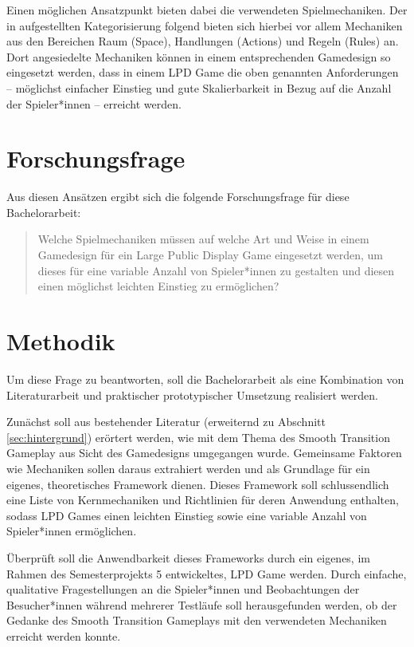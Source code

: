 Einen möglichen Ansatzpunkt bieten dabei die verwendeten Spielmechaniken. Der in \cite{Schell2014} aufgestellten Kategorisierung folgend bieten sich hierbei vor allem Mechaniken aus den Bereichen Raum (Space), Handlungen (Actions) und Regeln (Rules) an. Dort angesiedelte Mechaniken können in einem entsprechenden Gamedesign so eingesetzt werden, dass in einem LPD Game die oben genannten Anforderungen -- möglichst einfacher Einstieg und gute Skalierbarkeit in Bezug auf die Anzahl der Spieler*innen -- erreicht werden.

\section{Forschungsfrage}

Aus diesen Ansätzen ergibt sich die folgende Forschungsfrage für diese Bachelorarbeit:

\begin{quote}
Welche Spielmechaniken müssen auf welche Art und Weise in einem Gamedesign für ein Large Public Display Game eingesetzt werden, um dieses für eine variable Anzahl von Spieler*innen zu gestalten und diesen einen möglichst leichten Einstieg zu ermöglichen?
\end{quote}

\section{Methodik}

Um diese Frage zu beantworten, soll die Bachelorarbeit als eine Kombination von Literaturarbeit und praktischer \bzw prototypischer Umsetzung realisiert werden.

Zunächst soll aus bestehender Literatur (erweiternd zu Abschnitt \ref{sec:hintergrund}) erörtert werden, wie mit dem Thema des Smooth Transition Gameplay aus Sicht des Gamedesigns umgegangen wurde. Gemeinsame Faktoren wie Mechaniken sollen daraus extrahiert werden und als Grundlage für ein eigenes, theoretisches Framework dienen. Dieses Framework soll schlussendlich eine Liste von Kernmechaniken und Richtlinien für deren Anwendung enthalten, sodass LPD Games einen leichten Einstieg sowie eine variable Anzahl von Spieler*innen ermöglichen.

Überprüft soll die Anwendbarkeit dieses Frameworks durch ein eigenes, im Rahmen des Semesterprojekts 5 entwickeltes, LPD Game werden. Durch einfache, qualitative Fragestellungen an die Spieler*innen und Beobachtungen der Besucher*innen während mehrerer Testläufe soll herausgefunden werden, ob der Gedanke des Smooth Transition Gameplays mit den verwendeten Mechaniken erreicht werden konnte.

